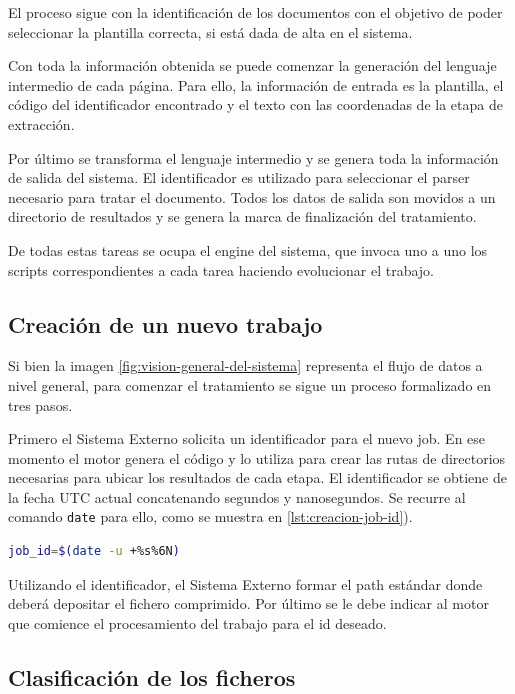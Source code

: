 El proceso sigue con la identificación de los documentos con el objetivo de poder seleccionar la plantilla correcta, si está dada de alta en el sistema. 

Con toda la información obtenida se puede comenzar la generación del lenguaje intermedio de cada página. Para ello, la información de entrada es la plantilla, el código del identificador encontrado y el texto con las coordenadas de la etapa de extracción.

Por último se transforma el lenguaje intermedio y se genera toda la información de salida del sistema. El identificador es utilizado para seleccionar el parser necesario para tratar el documento. Todos los datos de salida son movidos a un directorio de resultados y se genera la marca de finalización del tratamiento.

De todas estas tareas se ocupa el engine del sistema, que invoca uno a uno los scripts correspondientes a cada tarea haciendo evolucionar el trabajo.

\subsection{Creación de un nuevo trabajo}

Si bien la imagen \ref{fig:vision-general-del-sistema} representa el flujo de datos a nivel general, para comenzar el tratamiento se sigue un proceso formalizado en tres pasos. 

Primero el Sistema Externo solicita un identificador para el nuevo job. En ese momento el motor genera el código y lo utiliza para crear las rutas de directorios necesarias para ubicar los resultados de cada etapa. El identificador se obtiene de la fecha UTC actual concatenando segundos y nanosegundos. Se recurre al comando \verb|date| para ello, como se muestra en \ref{lst:creacion-job-id}).

\begin{lstlisting}[language=bash,caption={Obtención del identificador de un trabajo},label=lst:creacion-job-id]
job_id=$(date -u +%s%6N)
\end{lstlisting}

Utilizando el identificador, el Sistema Externo formar el path estándar donde deberá depositar el fichero comprimido. Por último se le debe indicar al motor que comience el procesamiento del trabajo para el id deseado.

\subsection{Clasificación de los ficheros}

